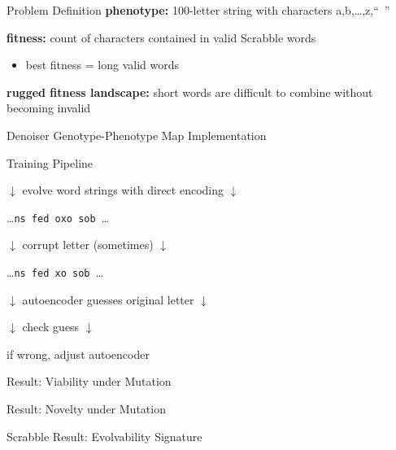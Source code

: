 
\begin{frame}{Problem Definition}
\textbf{phenotype:} 100-letter string with characters a,b,\dots,z,``~''
\vspace{2ex}
\pause

\textbf{fitness:} count of characters contained in valid Scrabble words
\begin{itemize}
\item best fitness = long valid words
\end{itemize}

\vspace{2ex}
\pause

\textbf{rugged fitness landscape:}
short words are difficult to combine without becoming invalid

\end{frame}

\begin{frame}{Denoiser Genotype-Phenotype Map Implementation}



\end{frame}

\begin{frame}{Training Pipeline}

\centering \Large

\textcolor{h2}{$\downarrow$ evolve word strings with direct encoding $\downarrow$}

\dots\texttt{ns fed oxo sob }\dots

\pause

\textcolor{h2}{$\downarrow$ corrupt letter (sometimes) $\downarrow$}

\dots\texttt{ns fed xo sob }\dots

\pause

\textcolor{h2}{$\downarrow$ autoencoder guesses original letter $\downarrow$}

\texttt{}

\pause

\textcolor{h2}{$\downarrow$ check guess $\downarrow$}

if wrong, adjust autoencoder

\end{frame}

\begin{frame}{Result: Viability under Mutation}



\end{frame}

\begin{frame}{Result: Novelty under Mutation}



\end{frame}

\begin{frame}{Scrabble Result: Evolvability Signature}



\end{frame}
